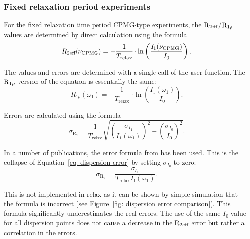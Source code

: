 \subsubsection{Fixed relaxation period experiments}

For the fixed relaxation time period CPMG-type experiments, the $\mathrm{R}_{2\textrm{eff}}$/$\mathrm{R}_{1\rho}$ values are determined by direct calculation using the formula
\begin{equation}
    R_{2\textrm{eff}}(\nu_\textrm{CPMG}) = - \frac{1}{T_\textrm{relax}} \cdot \ln \left( \frac{I_1(\nu_\textrm{CPMG})}{I_0} \right) .
\end{equation}

The values and errors are determined with a single call of the  user function.  The $\mathrm{R}_{1\rho}$ version of the equation is essentially the same:
\begin{equation}
    R_{1\rho}(\omega_1) = - \frac{1}{T_\textrm{relax}} \cdot \ln \left( \frac{I_1(\omega_1)}{I_0} \right) .
\end{equation}

Errors are calculated using the formula
\begin{equation} \label{eq: dispersion error}
    \sigma_{\textrm{R}_2} = \frac{1}{T_\textrm{relax}} \sqrt{ \left( \frac{\sigma_{I_1}}{I_1(\omega_1)} \right)^2  +  \left( \frac{\sigma_{I_0}}{I_0} \right)^2 } .
\end{equation}

In a number of publications, the error formula from \citet{IshimaTorchia05} has been used.  This is the collapse of Equation~\ref{eq: dispersion error} by setting $\sigma_{I_0}$ to zero:
\begin{equation} \label{eq: IT05 dispersion error}
    \sigma_{\textrm{R}_2} = \frac{\sigma_{I_1}}{T_\textrm{relax} I_1(\omega_1)} .
\end{equation}

This is not implemented in relax as it can be shown by simple simulation that the formula is incorrect (see Figure~\ref{fig: dispersion error comparison}).  This formula significantly underestimates the real errors.  The use of the same $I_0$ value for all dispersion points does not cause a decrease in the $\mathrm{R}_{2\textrm{eff}}$ error but rather a correlation in the errors.

